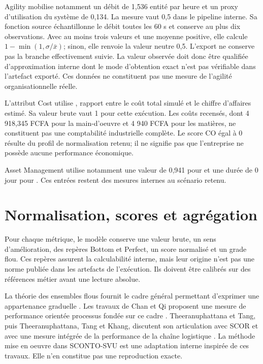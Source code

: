 Agility mobilise notamment un débit de 1,536 entité par heure et un proxy d'utilisation du système de 0,134. La mesure  vaut 0,5 dans le pipeline interne. Sa fonction source échantillonne le débit toutes les 60 s et conserve au plus dix observations. Avec au moins trois valeurs et une moyenne positive, elle calcule \(1-\min(1,\sigma/\bar{x})\); sinon, elle renvoie la valeur neutre 0,5. L'export ne conserve pas la branche effectivement suivie. La valeur observée doit donc être qualifiée d'approximation interne dont le mode d'obtention exact n'est pas vérifiable dans l'artefact exporté. Ces données ne constituent pas une mesure de l'agilité organisationnelle réelle.

L'attribut Cost utilise , rapport entre le coût total simulé et le chiffre d'affaires estimé. Sa valeur brute vaut 1 pour cette exécution. Les coûts recensés, dont 4 918,345 FCFA pour la main-d'oeuvre et 4 940 FCFA pour les matières, ne constituent pas une comptabilité industrielle complète. Le score CO égal à 0 résulte du profil de normalisation retenu; il ne signifie pas que l'entreprise ne possède aucune performance économique.

Asset Management utilise notamment une valeur de 0,941 pour  et une durée de 0 jour pour . Ces entrées restent des mesures internes au scénario retenu.

\section{Normalisation, scores et agrégation}

Pour chaque métrique, le modèle conserve une valeur brute, un sens d'amélioration, des repères Bottom et Perfect, un score normalisé et un grade flou. Ces repères assurent la calculabilité interne, mais leur origine n'est pas une norme publiée dans les artefacts de l'exécution. Ils doivent être calibrés sur des références métier avant une lecture absolue.

La théorie des ensembles flous fournit le cadre général permettant d'exprimer une appartenance graduelle \cite{zadeh1965}. Les travaux de Chan et Qi proposent une mesure de performance orientée processus fondée sur ce cadre \cite{chanqi2003}. Theeranuphattana et Tang, puis Theeranuphattana, Tang et Khang, discutent son articulation avec SCOR et avec une mesure intégrée de la performance de la chaîne logistique \cite{theeranuphattana2008,theeranuphattana2012}. La méthode mise en oeuvre dans SCONTO-SVU est une adaptation interne inspirée de ces travaux. Elle n'en constitue pas une reproduction exacte.

